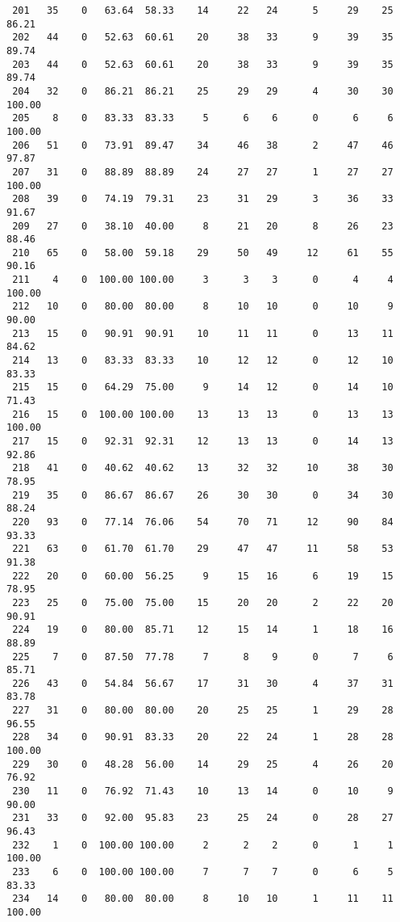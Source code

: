 \begin{verbatim}
 201   35    0   63.64  58.33    14     22   24      5     29    25    86.21
 202   44    0   52.63  60.61    20     38   33      9     39    35    89.74
 203   44    0   52.63  60.61    20     38   33      9     39    35    89.74
 204   32    0   86.21  86.21    25     29   29      4     30    30   100.00
 205    8    0   83.33  83.33     5      6    6      0      6     6   100.00
 206   51    0   73.91  89.47    34     46   38      2     47    46    97.87
 207   31    0   88.89  88.89    24     27   27      1     27    27   100.00
 208   39    0   74.19  79.31    23     31   29      3     36    33    91.67
 209   27    0   38.10  40.00     8     21   20      8     26    23    88.46
 210   65    0   58.00  59.18    29     50   49     12     61    55    90.16
 211    4    0  100.00 100.00     3      3    3      0      4     4   100.00
 212   10    0   80.00  80.00     8     10   10      0     10     9    90.00
 213   15    0   90.91  90.91    10     11   11      0     13    11    84.62
 214   13    0   83.33  83.33    10     12   12      0     12    10    83.33
 215   15    0   64.29  75.00     9     14   12      0     14    10    71.43
 216   15    0  100.00 100.00    13     13   13      0     13    13   100.00
 217   15    0   92.31  92.31    12     13   13      0     14    13    92.86
 218   41    0   40.62  40.62    13     32   32     10     38    30    78.95
 219   35    0   86.67  86.67    26     30   30      0     34    30    88.24
 220   93    0   77.14  76.06    54     70   71     12     90    84    93.33
 221   63    0   61.70  61.70    29     47   47     11     58    53    91.38
 222   20    0   60.00  56.25     9     15   16      6     19    15    78.95
 223   25    0   75.00  75.00    15     20   20      2     22    20    90.91
 224   19    0   80.00  85.71    12     15   14      1     18    16    88.89
 225    7    0   87.50  77.78     7      8    9      0      7     6    85.71
 226   43    0   54.84  56.67    17     31   30      4     37    31    83.78
 227   31    0   80.00  80.00    20     25   25      1     29    28    96.55
 228   34    0   90.91  83.33    20     22   24      1     28    28   100.00
 229   30    0   48.28  56.00    14     29   25      4     26    20    76.92
 230   11    0   76.92  71.43    10     13   14      0     10     9    90.00
 231   33    0   92.00  95.83    23     25   24      0     28    27    96.43
 232    1    0  100.00 100.00     2      2    2      0      1     1   100.00
 233    6    0  100.00 100.00     7      7    7      0      6     5    83.33
 234   14    0   80.00  80.00     8     10   10      1     11    11   100.00

\end{verbatim}
